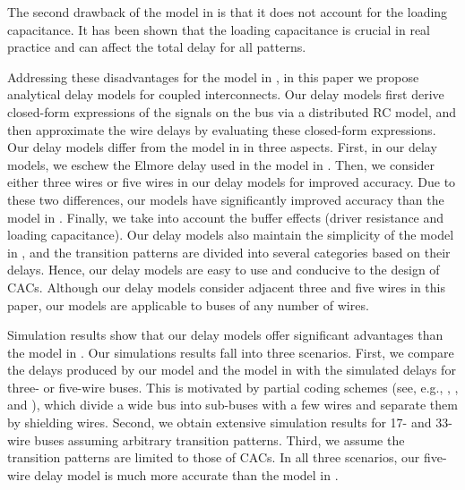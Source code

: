 \documentclass[10pt,journal]{IEEEtran}
\begin{document}
The second drawback of the model in \cite{Sot01} is that it does not account for the loading capacitance. It has been shown that the loading capacitance is crucial in real practice and can affect the total delay for all patterns.




Addressing these disadvantages for the model in \cite{Sot01}, in this paper we propose analytical delay models for coupled interconnects. Our delay models first derive closed-form expressions of the signals on the bus via a distributed RC model, and then approximate the wire delays by evaluating these closed-form expressions.
Our delay models differ from the model in \cite{Sot01} in three aspects. First, in our delay models, we eschew the Elmore delay used in the model in \cite{Sot01}. Then, we consider either three wires or five wires in our delay models for improved accuracy. Due to these two differences, our models have significantly improved accuracy than the model in \cite{Sot01}. Finally, we take into account the buffer effects (driver resistance and loading capacitance). Our delay models also maintain the simplicity of the model in \cite{Sot01}, and the transition patterns are divided into several categories based on their delays. Hence, our delay models are easy to use and conducive to the design of CACs.
Although our delay models consider adjacent three and five wires in this paper, our models are applicable to buses of any number of wires.

Simulation results show that our delay models offer significant advantages than the model in \cite{Sot01}. Our simulations results fall into three scenarios. First, we compare the delays produced by our model and the model in \cite{Sot01} with the simulated delays for three- or five-wire buses. This is motivated by partial coding schemes (see, e.g., \cite{Dua01}, \cite{Vic01}, and \cite{Sri07}), which divide a wide bus into sub-buses with a few wires and separate them by shielding wires.
Second, we obtain extensive simulation results for 17- and 33-wire buses assuming arbitrary transition patterns. Third, we assume the transition patterns are limited to those of CACs. In all three scenarios, our five-wire delay model is much more accurate than the model in \cite{Sot01}. 
\end{document}
